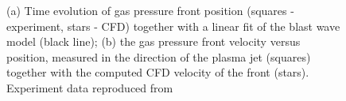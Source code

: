 \documentclass[a4paper]{iacas}%
\begin{document}
\begin{figure}
	\caption{(a) Time evolution of gas pressure front position (squares - experiment, stars - CFD) together with a linear fit of the blast wave model (black line); (b) the gas pressure front velocity versus position, measured in the direction of the plasma jet (squares) together with the computed CFD velocity of the front (stars). Experiment data reproduced from \cite{KR}}
	\label{fig:model_blast}
\end{figure}
\end{document}
